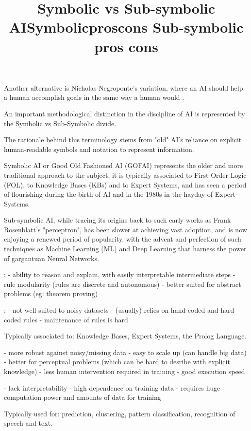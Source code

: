 Another alternative is Nicholas Negroponte's variation, where an AI should help a human accomplish goals in the same way a human would \cite{smith2006history}.

\title{ Symbolic vs Sub-symbolic AI}

An important methodological distinction in the discipline of AI is represented by the Symbolic vs Sub-Symbolic divide.

The rationale behind this terminology stems from "old" AI's reliance on explicit human-readable symbols and notation to represent information.

Symbolic AI or Good Old Fashioned AI (GOFAI) represents the older and more traditional approach to the subject, it is typically associated to First Order Logic (FOL), to Knowledge Bases (KBs) and to Expert Systems, and has seen a period of flourishing during the birth of AI and in the 1980s in the hayday of Expert Systems.

Sub-symbolic AI, while tracing its origins back to such early works as Frank Rosenblatt's "perceptron", has been slower at achieving vast adoption, and is now enjoying a renewed period of popularity, with the advent and perfection of such techniques as Machine Learning (ML) and Deep Learning that harness the power of gargantuan Neural Networks.

\title{Symbolic}

\title{pros}:
- ability to reason and explain, with easily interpretable intermediate steps
- rule modularity (rules are discrete and autonomous)
- better suited for abstract problems (eg: theorem proving)
\title{cons}:
- not well suited to noisy datasets
- (usually) relies on hand-coded and hard-coded rules
- maintenance of rules is hard

Typically associated to: Knowledge Bases, Expert Systems, the Prolog Language.

\title{ Sub-symbolic}

\title{ pros}
- more robust against noisy/missing data
- easy to scale up (can handle big data)
- better for perceptual problems (which can be hard to desribe with explicit knowledge)
- less human intervention required in training
- good execution speed

\title{ cons}
- lack interpretability
- high dependence on training data
- requires huge computation power and amounts of data for training

Typically used for: prediction, clustering, pattern classification, recognition of speech and text.

